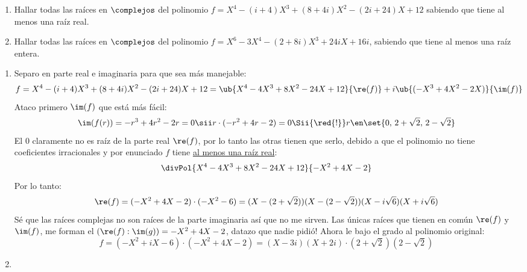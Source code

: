 \begin{enunciado}{\ejercicio}
  \begin{enumerate}[label=\roman*)]
    \item Hallar todas las raíces en $\complejos$ del polinomio
          $f = X^4 - (i + 4)X^3 + (8 + 4i)X^2 - (2i + 24)X + 12$
          sabiendo que tiene al menos una raíz real.

    \item Hallar todas las raíces en $\complejos$ del polinomio
          $f = X^6 - 3X^4 -  (2 + 8i)X^3 + 24iX + 16i$,
          sabiendo que tiene al menos una raíz entera.
  \end{enumerate}
\end{enunciado}

\begin{enumerate}[label=(\alph*)]
  \item Separo en parte real e imaginaria para que sea más manejable:
        {\small
        $$
          f = X^4 - (i + 4)X^3 + (8 + 4i)X^2 - (2i + 24)X + 12 =
          \ub{
            X^4 - 4X^3 + 8X^2 -24X + 12
          }{
            \re(f)
          }
          + i \ub{
            (-X^3 + 4X^2 -2X)
          }{
            \im(f)
          }
        $$
        }
        Ataco primero $\im(f)$ que está más fácil:
        $$
          \im(f(r)) = -r^3 + 4r^2 -2r = 0
          \sii
          r\cdot(-r^2 + 4r -2) = 0
          \Sii{\red{!}}
          r \en \set{0,\, 2 + \sqrt{2},\, 2 - \sqrt{2}}
        $$
        El 0 claramente no es raíz de la parte real $\re(f)$, por lo tanto las otras tienen que serlo, debido a que el polinomio no tiene
        coeficientes irracionales y por enunciado $f$ tiene \ul{al menos una raíz real}:
        $$
          \divPol{X^4 - 4X^3 + 8X^2 -24X + 12}{-X^2 + 4X -2}
        $$
        Por lo tanto:
        $$
          \re(f) =  (-X^2 + 4X -2) \cdot (-X^2 - 6) = (X - (2 + \sqrt{2}))(X - (2 - \sqrt{2}))(X - i\sqrt{6})(X + i\sqrt{6})
        $$
        Sé que las raíces complejas no son raíces de la parte imaginaria así que no me sirven. Las únicas raíces que tienen en común
        $\re(f)$ y $\im(f)$, me forman el $(\re(f): \im(g)) = -X^2 + 4X -2$, datazo que nadie pidió!
        Ahora le bajo el grado al polinomio original:
        $$
          f = (-X^2 + iX -6) \cdot (-X^2 + 4X -2) =
          (X - 3i)
          (X + 2i)\cdot
          (2 + \sqrt{2})
          (2 - \sqrt{2})
        $$

  \item \hacer
\end{enumerate}

\begin{aportes}
  \item {}
\end{aportes}
